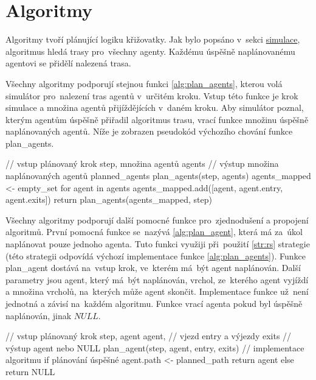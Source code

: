 \chapter{Algoritmy}\label{ch:algoritmy}

%

Algoritmy tvoří plánující logiku křižovatky.
Jak bylo popsáno v~sekci \hyperref[sec:simulace]{simulace}, algoritmus hledá trasy pro~všechny agenty.
Každému úspěšně naplánovanému agentovi se přidělí nalezená trasa.

Všechny algoritmy podporují stejnou funkci \ref{alg:plan_agents},
kterou volá simulátor pro~nalezení tras agentů v~určitém kroku.
Vstup této funkce je krok simulace a množina agentů přijíždějících v~daném kroku.
Aby simulátor poznal, kterým agentům úspěšně přiřadil algoritmus trasu,
vrací funkce množinu úspěšně naplánovaných agentů.
Níže je zobrazen pseudokód výchozího chování funkce
\textrm{plan\_agents}.

\begin{code}[xrightmargin=6em]
// vstup plánovaný krok step, množina agentů agents
// výstup množina naplánovaných agentů planned_agents
plan_agents(step, agents)
agents_mapped <- empty_set
for agent in agents
agents_mapped.add([agent, agent.entry, agent.exits])
return plan_agents(agents_mapped, step)
\end{code}

Všechny algoritmy podporují další pomocné funkce pro~zjednodušení a propojení algoritmů.
První pomocná funkce se~nazývá \ref{alg:plan_agent},
která má za~úkol naplánovat pouze jednoho agenta.
Tuto funkci využiji při~použití \ref{str:rs} strategie
(této strategii odpovídá výchozí implementace funkce \ref{alg:plan_agents}).
Funkce \textrm{plan\_agent} dostává na~vstup krok, ve~kterém má~být agent naplánován.
Další parametry jsou agent, který má~být naplánován, vrchol,
ze~kterého agent vyjíždí a množina vrcholů, na~kterých může agent skončit.
Implementace funkce už~není jednotná a závisí na~každém algoritmu.
Funkce vrací agenta pokud byl úspěšně naplánován, jinak $NULL$.

\begin{code}[xrightmargin=14em]
// vstup plánovaný krok step, agent agent,
// vjezd entry a výjezdy exits
// výstup agent nebo NULL
plan_agent(step, agent, entry, exits)
// implementace algoritmu
if plánování úspěšné
agent.path <- planned_path
return agent
else
return NULL
\end{code}

